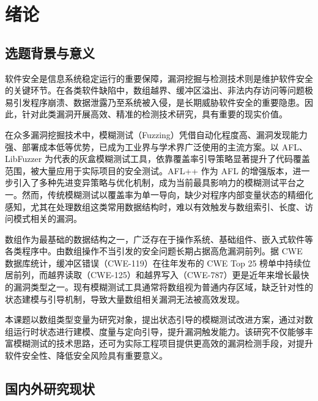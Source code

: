 \documentclass[bachelor]{njupthesis}
\begin{document}
\thesistableofcontents

\thesischapterexordium

\chapter{绪论}

\section{选题背景与意义}

软件安全是信息系统稳定运行的重要保障，漏洞挖掘与检测技术则是维护软件安全的关键环节。在各类软件缺陷中，数组越界、缓冲区溢出、非法内存访问等问题极易引发程序崩溃、数据泄露乃至系统被入侵，是长期威胁软件安全的重要隐患\cite{memcorrupt}。因此，针对此类漏洞开展高效、精准的检测技术研究，具有重要的现实价值。

在众多漏洞挖掘技术中，模糊测试（Fuzzing）凭借自动化程度高、漏洞发现能力强、部署成本低等优势，已成为工业界与学术界广泛使用的主流方案\cite{AFL}。以 AFL\cite{AFL}、LibFuzzer\cite{LIBFUZZER} 为代表的灰盒模糊测试工具，依靠覆盖率引导策略显著提升了代码覆盖范围，被大量应用于实际项目的安全测试。AFL++\cite{AFLPLUSPLUS} 作为 AFL 的增强版本，进一步引入了多种先进变异策略与优化机制，成为当前最具影响力的模糊测试平台之一。然而，传统模糊测试以覆盖率为单一导向，缺少对程序内部变量状态的精细化感知，尤其在处理数组这类常用数据结构时，难以有效触发与数组索引、长度、访问模式相关的漏洞。

数组作为最基础的数据结构之一，广泛存在于操作系统、基础组件、嵌入式软件等各类程序中。由数组操作不当引发的安全问题长期占据高危漏洞前列\cite{CWE119,CWE125,CWE787}。据 CWE 数据库统计，缓冲区错误（CWE-119）在往年发布的 CWE Top 25 榜单中持续位居前列，而越界读取（CWE-125）和越界写入（CWE-787）更是近年来增长最快的漏洞类型之一\cite{CVEdatabase}。现有模糊测试工具通常将数组视为普通内存区域，缺乏针对性的状态建模与引导机制，导致大量数组相关漏洞无法被高效发现。

本课题以数组类型变量为研究对象，提出状态引导的模糊测试改进方案，通过对数组运行时状态进行建模、度量与定向引导，提升漏洞触发能力。该研究不仅能够丰富模糊测试的技术思路，还可为实际工程项目提供更高效的漏洞检测手段，对提升软件安全性、降低安全风险具有重要意义。

\section{国内外研究现状}
\end{document}
